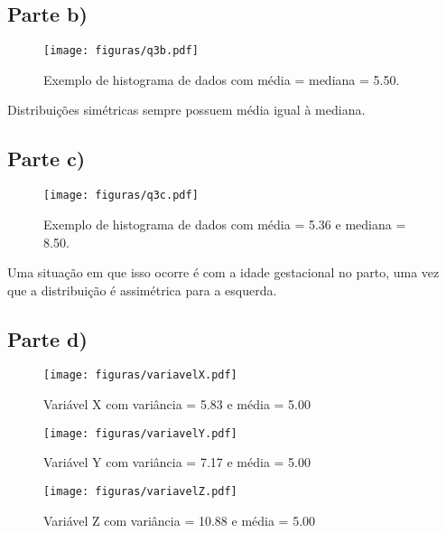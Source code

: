 \documentclass[
	12pt,				%
	openright,			%
	twoside,			%
	a4paper,			%
	english,			%
	french,				%
	spanish,			%
	brazil,				%
	]{abntex2}
\begin{document}
\subsection{Parte b)}
\begin{figure}[!htbp]
	\begin{center}
	    \texttt{[image: figuras/q3b.pdf]}
	\end{center}
\caption{Exemplo de histograma de dados com média = mediana = 5.50.}
\end{figure}
Distribuições simétricas sempre possuem média igual à mediana.

\subsection{Parte c)}
\begin{figure}[H]
	\begin{center}
	    \texttt{[image: figuras/q3c.pdf]}
	\end{center}
\caption{Exemplo de histograma de dados com média = 5.36 e mediana = 8.50.}
\end{figure}
Uma situação em que isso ocorre é com a idade gestacional no parto, uma vez que a distribuição é assimétrica para a esquerda.

\subsection{Parte d)}
\begin{figure}[!htbp]
	\begin{center}
	    \texttt{[image: figuras/variavelX.pdf]}
	\end{center}
\caption{Variável X com variância = 5.83 e média = 5.00}
\end{figure}

\begin{figure}[!htbp]
	\begin{center}
	    \texttt{[image: figuras/variavelY.pdf]}
	\end{center}
\caption{Variável Y com variância = 7.17 e média = 5.00}
\end{figure}

\begin{figure}[!htbp]
	\begin{center}
	    \texttt{[image: figuras/variavelZ.pdf]}
	\end{center}
\caption{Variável Z com variância = 10.88 e média = 5.00}
\end{figure}
\end{document}
